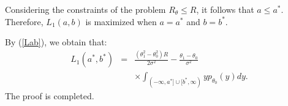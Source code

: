 \documentclass[journal]{IEEEtran}
\def \qed {\hfill \vrule height6pt width 6pt depth 0pt}
\def\beq{\begin{eqnarray}}
\def\enq{\end{eqnarray}}
\begin{document}
Considering the constraints of the problem $R_{\theta}\leqslant R$, it follows that $a\leqslant a^*$. Therefore, $L_1(a,b)$ is maximized when $a=a^{*}$ and $b=b^{*}$.

By (\ref{Lab}), we obtain that:
\beq
L_{1}(a^{*},b^{*}) &=& \frac{{(\theta _1^2 - \theta _0^2)R}}{{2{\sigma ^2}}} - \frac{{{\theta _1} - {\theta _0}}}{{{\sigma ^2}}}\nonumber\\
&&\times\int_{( - \infty ,a^{*}] \cup [b^{*},\infty )}^{} {y{p_{{\theta _0}}}(y)}dy\nonumber.
\enq
The proof is completed.\qed









                   
\end{document}
